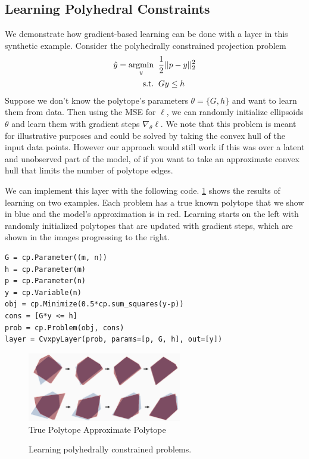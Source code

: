 \subsection{Learning Polyhedral Constraints}
We demonstrate how gradient-based learning can be done with
a \cvxpy layer in this synthetic example.
Consider the polyhedrally constrained
projection problem
\begin{align*}
\hat y = \operatorname*{argmin}_y\;\; &\frac{1}{2}||p-y||_2^2  \\
 {\rm s.t.}\;\; & Gy\leq h \\
\end{align*}
Suppose we don't know the polytope's parameters $\theta=\{G, h\}$
and want to learn them from data.
Then using the MSE for $\ell$, we can randomly initialize
ellipsoids $\theta$ and learn them with gradient steps $\nabla_\theta \ell$.
We note that this problem is meant for illustrative purposes and
could be solved by taking the convex hull of the input data points.
However our approach would still work if this was over a latent
and unobserved part of the model, of if you want to take an
approximate convex hull that limits the number of polytope edges.

We can implement this layer with the following code.
\cref{fig:polytope-results} shows the results of learning
on two examples.
Each problem has a true known polytope that we show in blue
and the model's approximation is in red.
Learning starts on the left with randomly initialized
polytopes that are updated with gradient steps,
which are shown in the images progressing to the right.

\begin{lstlisting}
G = cp.Parameter((m, n))
h = cp.Parameter(m)
p = cp.Parameter(n)
y = cp.Variable(n)
obj = cp.Minimize(0.5*cp.sum_squares(y-p))
cons = [G*y <= h]
prob = cp.Problem(obj, cons)
layer = CvxpyLayer(prob, params=[p, G, h], out=[y])
\end{lstlisting}

\begin{figure}[t]
  \centering
  \includegraphics[width=0.6\textwidth]{polytope-frames.png} \\
   True Polytope \enskip
   Approximate Polytope
  \caption{
    Learning polyhedrally constrained problems.
  }
  \label{fig:polytope-results}
\end{figure}

